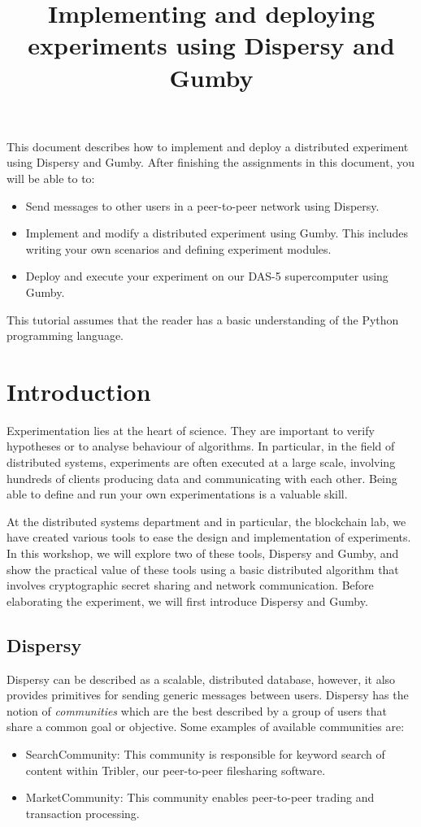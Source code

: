 \documentclass{article}
\title{Implementing and deploying experiments using Dispersy and Gumby}
\begin{document}
\maketitle

This document describes how to implement and deploy a distributed experiment using Dispersy and Gumby.
After finishing the assignments in this document, you will be able to to:
\begin{itemize}
	\item Send messages to other users in a peer-to-peer network using Dispersy.
	\item Implement and modify a distributed experiment using Gumby. This includes writing your own scenarios and defining experiment modules.
	\item Deploy and execute your experiment on our DAS-5 supercomputer using Gumby.
\end{itemize}

This tutorial assumes that the reader has a basic understanding of the Python programming language.

\section{Introduction}
Experimentation lies at the heart of science. They are important to verify hypotheses or to analyse behaviour of algorithms.
In particular, in the field of distributed systems, experiments are often executed at a large scale, involving hundreds of clients producing data and communicating with each other.
Being able to define and run your own experimentations is a valuable skill.

At the distributed systems department and in particular, the blockchain lab, we have created various tools to ease the design and implementation of experiments. In this workshop, we will explore two of these tools, Dispersy and Gumby, and show the practical value of these tools using a basic distributed algorithm that involves cryptographic secret sharing and network communication.
Before elaborating the experiment, we will first introduce Dispersy and Gumby.

\subsection{Dispersy}
Dispersy can be described as a scalable, distributed database, however, it also provides primitives for sending generic messages between users.
Dispersy has the notion of \emph{communities} which are the best described by a group of users that share a common goal or objective.
Some examples of available communities are:
\begin{itemize}
	\item SearchCommunity: This community is responsible for keyword search of content within Tribler, our peer-to-peer filesharing software.
	\item MarketCommunity: This community enables peer-to-peer trading and transaction processing.
\end{itemize}
\end{document}
